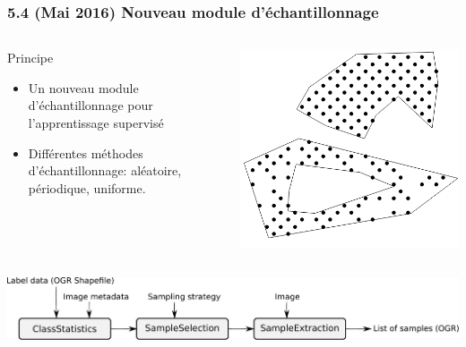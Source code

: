 \documentclass[8pt]{beamer}
\begin{document}
\begin{frame}
\frametitle{5.4 (Mai 2016) Nouveau module d'échantillonnage}
\begin{columns}

\begin{column}{0.6\textwidth}
\begin{block}{Principe}
\begin{itemize}
\item Un nouveau module d'échantillonnage pour l'apprentissage supervisé
\item Différentes méthodes d'échantillonnage: aléatoire, périodique, uniforme.
\end{itemize}
\end{block}
\end{column}

\begin{column}{0.4\textwidth}
\includegraphics[width=.8\textwidth]{art/sampling.png}
\end{column}
\end{columns}

\begin{center}
\includegraphics[width=\textwidth]{art/sampling_module.pdf}
\end{center}

\end{frame}
\end{document}
